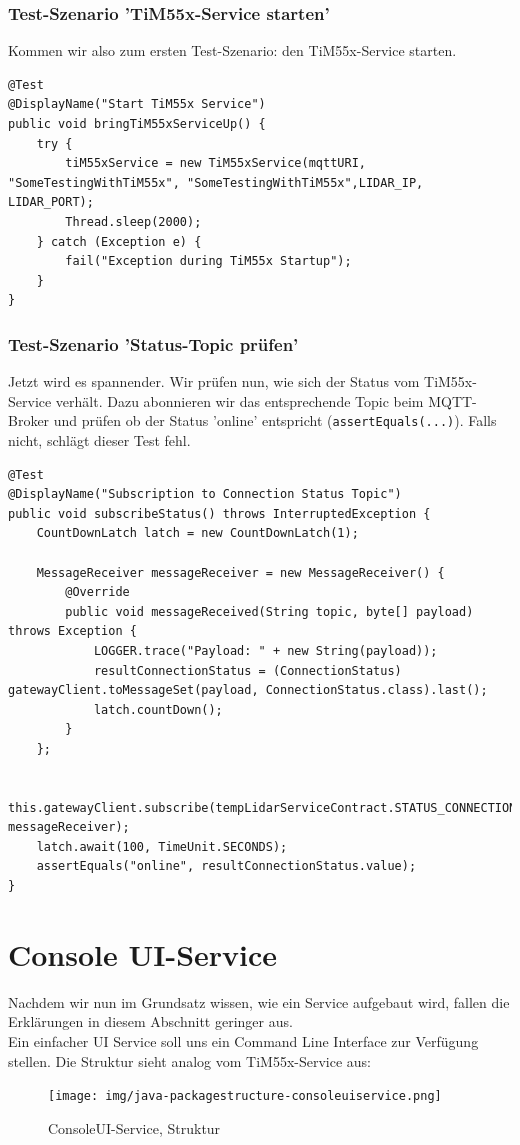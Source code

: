 \subsubsection{Test-Szenario 'TiM55x-Service starten'}
Kommen wir also zum ersten Test-Szenario: den TiM55x-Service starten.
\begin{lstlisting}[caption={TiM55x Startup-Test}]
@Test
@DisplayName("Start TiM55x Service")
public void bringTiM55xServiceUp() {
    try {
        tiM55xService = new TiM55xService(mqttURI, "SomeTestingWithTiM55x", "SomeTestingWithTiM55x",LIDAR_IP, LIDAR_PORT);
        Thread.sleep(2000);
    } catch (Exception e) {
        fail("Exception during TiM55x Startup");
    }
}
\end{lstlisting}

\subsubsection{Test-Szenario 'Status-Topic prüfen'}
Jetzt wird es spannender. Wir prüfen nun, wie sich der Status vom TiM55x-Service verhält. Dazu abonnieren wir das entsprechende Topic beim MQTT-Broker und prüfen ob der Status 'online' entspricht (\verb|assertEquals(...)|). Falls nicht, schlägt dieser Test fehl.
\begin{lstlisting}
@Test
@DisplayName("Subscription to Connection Status Topic")
public void subscribeStatus() throws InterruptedException {
    CountDownLatch latch = new CountDownLatch(1);

    MessageReceiver messageReceiver = new MessageReceiver() {
        @Override
        public void messageReceived(String topic, byte[] payload) throws Exception {
            LOGGER.trace("Payload: " + new String(payload));
            resultConnectionStatus = (ConnectionStatus) gatewayClient.toMessageSet(payload, ConnectionStatus.class).last();
            latch.countDown();
        }
    };

    this.gatewayClient.subscribe(tempLidarServiceContract.STATUS_CONNECTION, messageReceiver);
    latch.await(100, TimeUnit.SECONDS);
    assertEquals("online", resultConnectionStatus.value);
}
\end{lstlisting}

\section{Console UI-Service}
Nachdem wir nun im Grundsatz wissen, wie ein Service aufgebaut wird, fallen die Erklärungen in diesem Abschnitt geringer aus.\\ Ein einfacher UI Service soll uns ein Command Line Interface zur Verfügung stellen. Die Struktur sieht analog vom TiM55x-Service aus:
\begin{figure}[H]
	\centering
	\texttt{[image: img/java-packagestructure-consoleuiservice.png]}
	\caption{ConsoleUI-Service, Struktur}
	\label{fig:structure_consoleuiservice}
\end{figure}
